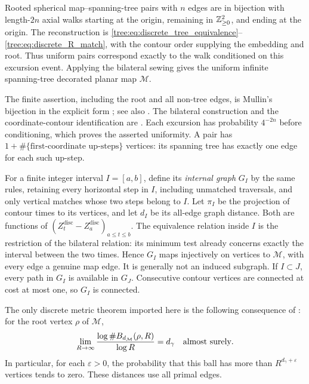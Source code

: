 \begin{theorem}
\label{tree:thm:background_mullin}
Rooted spherical map--spanning-tree pairs with $n$ edges are in
bijection with length-$2n$ axial walks starting at the origin,
remaining in $\mathbb Z_{\geq0}^2$, and ending at the origin. The
reconstruction is \eqref{tree:eq:discrete_tree_equivalence}--
\eqref{tree:eq:discrete_R_match}, with the contour order supplying the
embedding and root. Thus uniform pairs correspond exactly to
the walk conditioned on this excursion event. Applying the
bilateral sewing gives the uniform infinite spanning-tree
decorated planar map $\mathcal M$.
\end{theorem}

The finite assertion, including the root and all non-tree edges,
is Mullin's bijection in the explicit form
\cite[Section~2.3, Theorem~1]{DHBijection}; see also
\cite[Section~3.2, Theorem~3.3]{HSSurvey}. The bilateral
construction and the coordinate-contour identification are
\cite[Sections~3.1.1--3.1.3, Proposition~3.3]{GwynneHoldenSunGraphDistances}.
Each excursion has probability $4^{-2n}$ before conditioning,
which proves the asserted uniformity. A pair has
$1+\#\{\text{first-coordinate up-steps}\}$ vertices: its
spanning tree has exactly one edge for each such up-step.

For a finite integer interval $I=[a,b]$, define its
\emph{internal graph} $G_I$ by the same rules, retaining every
horizontal step in $I$, including unmatched traversals, and
only vertical matches whose two steps belong to $I$.
Let $\pi_I$ be the projection of contour times to its vertices,
and let $d_I$ be its all-edge graph distance. Both are functions
of $(Z^{\mathrm{disc}}_t-Z^{\mathrm{disc}}_a)_{a\leq t\leq b}$.
The equivalence relation inside $I$ is the restriction of the
bilateral relation: its minimum test already concerns exactly
the interval between the two times. Hence $G_I$ maps injectively
on vertices to $\mathcal M$, with every edge a genuine map edge.
It is generally not an induced subgraph. If $I\subset J$, every
path in $G_I$ is available in $G_J$. Consecutive contour vertices
are connected at cost at most one, so $G_I$ is connected.

The only discrete metric theorem imported here is the following
consequence of \cite[Theorem~1.6, model~2]{DingGwynneDimension}: for the
root vertex $\rho$ of $\mathcal M$,
\begin{equation}\label{tree:eq:background_volume}
 \lim_{R\to\infty}\frac{\log\#B_{d_{\mathcal M}}(\rho,R)}
 {\log R}=d_\gamma\quad\hbox{almost surely}.
\end{equation}
In particular, for each $\varepsilon>0$, the probability that
this ball has more than $R^{d_\gamma+\varepsilon}$ vertices tends
to zero. These distances use all primal edges.

